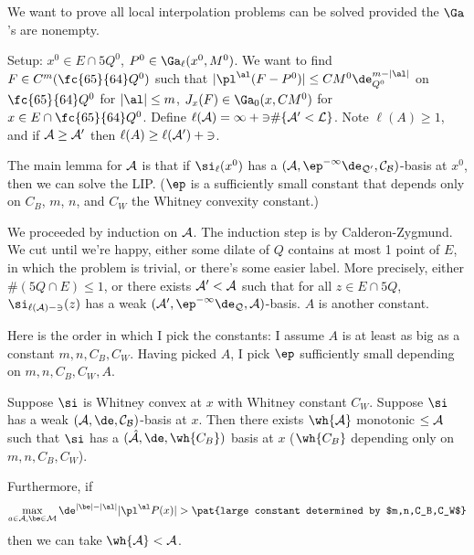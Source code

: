 


We want to prove all local interpolation problems can be solved provided the $\Ga$'s are nonempty.

Setup: $x^0\in E\cap 5Q^0$, $P^0\in \Ga_\ell(x^0,M^0)$. We want to find $F\in C^m(\fc{65}{64} Q^0)$ such that $|\pl^\al(F-P^0)|\le CM^0 \de_{Q^0}^{m-|\al|}$ on $\fc{65}{64} Q^0$ for $|\al|\le m$, $J_x(F)\in \Ga_0(x,CM^0)$ for $x\in E\cap \fc{65}{64}Q^0$. 
Define $\ell(\cal A)=1+3\#\{\cal A'<\cal L\}$. Note $\ell(A)\ge 1$, and if $\cal A\ge \cal A'$ then $\ell(A)\ge \ell(\cal A')+3$. 

The main lemma for $\cal A$ is that if 
$\si_\ell(x^0)$ has a $(\cal A, \ep^{-1}\de_{Q^0}, C_B)$-basis at $x^0$, then we can solve the LIP. ($\ep$ is a  sufficiently small constant that depends only on $C_B$, $m$, $n$, and $C_W$ the Whitney convexity constant.)

We proceeded by induction on $\cal A$.
The induction step is by Calderon-Zygmund. We cut until we're happy, either some dilate of $Q$ contains at most 1 point of $E$, in which the problem is trivial, or there's some easier label.
More precisely, either $\#(5Q\cap E)\le 1$, or there exists $\cal A'<\cal A$ such that for all $z\in E\cap 5Q$, $\si_{\ell(\cal A)-3}(z)$ has a weak $(\cal A', \ep^{-1}\de_Q, A)$-basis. $A$ is another constant.

Here is the order in which I pick the constants: I assume $A$ is at least as big as a constant $m,n,C_B,C_W$. Having picked $A$, I pick $\ep$ sufficiently small depending on $m,n,C_B,C_W,A$.

\begin{lem*}
Suppose $\si$ is Whitney convex at $x$ with Whitney constant $C_W$. Suppose $\si$ has a weak $(\cal A, \de, C_B)$-basis at $x$. Then there exists $\wh{\cal A}$ monotonic $\le \cal A$ such that $\si$ has a $(\hat{\cal A}, \de, \wh{C_B})$ basis at $x$ ($\wh{C_B}$ depending only on $m,n,C_B,C_W$).

Furthermore, if 
\begin{align}\label{e:relabel}
\max_{a\in \cal A, \be \in \cal M} \de^{|\be|-|\al|}|\pl^\al P(x)|>\pat{large constant determined by $m,n,C_B,C_W$}
\end{align}
then we can take $\wh{\cal A}<\cal A$.
\end{lem*}



